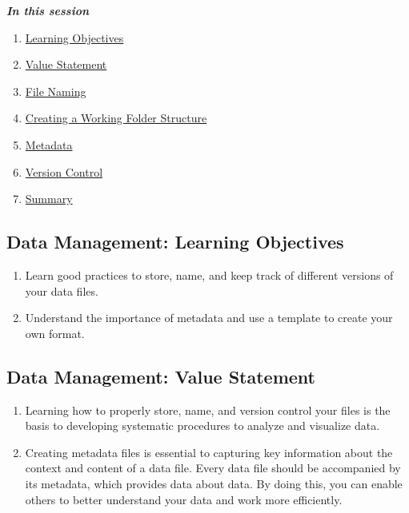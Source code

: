 \documentclass[
]{book}
\providecommand{\tightlist}{%
  \setlength{\itemsep}{0pt}\setlength{\parskip}{0pt}}
\begin{document}
\textbf{\emph{In this session}}

\begin{enumerate}
\def\labelenumi{\arabic{enumi}.}
\tightlist
\item
  \protect\hyperlink{data-management-learning-objectives}{Learning Objectives}
\item
  \protect\hyperlink{data-management-value-statement}{Value Statement}
\item
  \protect\hyperlink{file-naming}{File Naming}
\item
  \protect\hyperlink{creating-a-working-folder-structure}{Creating a Working Folder Structure}
\item
  \protect\hyperlink{metadata}{Metadata}
\item
  \protect\hyperlink{version-control}{Version Control}
\item
  \protect\hyperlink{data-management-summary}{Summary}
\end{enumerate}

\hypertarget{data-management-learning-objectives}{%
\subsection{Data Management: Learning Objectives}\label{data-management-learning-objectives}}

\begin{enumerate}
\def\labelenumi{\arabic{enumi}.}
\item
  Learn good practices to store, name, and keep track of different versions of your data files.
\item
  Understand the importance of metadata and use a template to create your own format.
\end{enumerate}

\hypertarget{data-management-value-statement}{%
\subsection{Data Management: Value Statement}\label{data-management-value-statement}}

\begin{enumerate}
\def\labelenumi{\arabic{enumi}.}
\item
  Learning how to properly store, name, and version control your files is the basis to developing systematic procedures to analyze and visualize data.
\item
  Creating metadata files is essential to capturing key information about the context and content of a data file. Every data file should be accompanied by its metadata, which provides data about data. By doing this, you can enable others to better understand your data and work more efficiently.
\end{enumerate}
\end{document}
